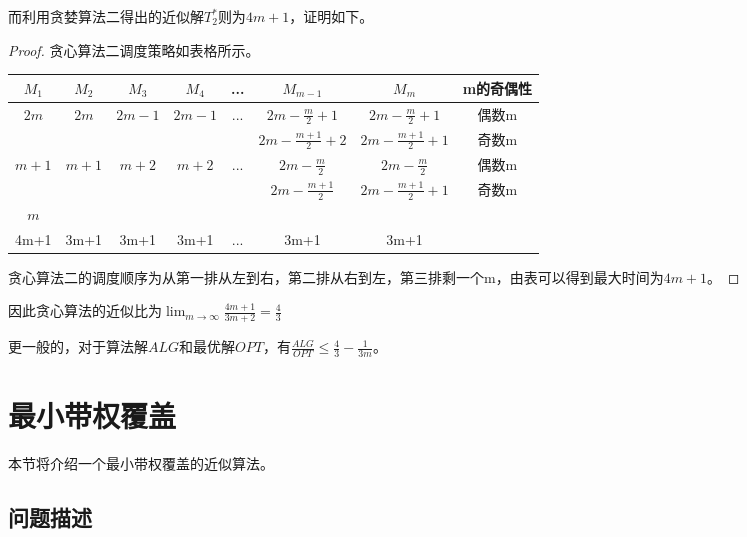 而利用贪婪算法二得出的近似解$T_2^*$则为$4m+1$，证明如下。
\begin{proof}
	贪心算法二调度策略如表格所示。
	\begin{table}[]
	\begin{tabular}{cccccccc}
	\hline
	$M_1$					&	$M_2$					&	$M_3$					&	$M_4$					&	...											&	$M_{m-1}$			&	$M_m$				&	m的奇偶性	\\ \hline
	\multirow{2}{*}{$2m$}	&	\multirow{2}{*}{$2m$}	&	\multirow{2}{*}{$2m-1$}	&	\multirow{2}{*}{$2m-1$}	&	\multicolumn{1}{c|}{\multirow{2}{*}{...}}	&	$2m-\frac{m}{2}+1$	&	$2m-\frac{m}{2}+1$	&	偶数m		\\ \cline{6-8} 
							&							&							&							&	\multicolumn{1}{c|}{}						&	$2m-\frac{m+1}{2}+2$&	$2m-\frac{m+1}{2}+1$&	奇数m		\\ \hline
	\multirow{2}{*}{$m+1$}	&	\multirow{2}{*}{$m+1$}	&	\multirow{2}{*}{$m+2$}	&	\multirow{2}{*}{$m+2$}	&	\multicolumn{1}{c|}{\multirow{2}{*}{...}}	&	$2m-\frac{m}{2}$	&	$2m-\frac{m}{2}$	&	偶数m		\\ \cline{6-8} 
							&							&							&							&	\multicolumn{1}{c|}{}						&	$2m-\frac{m+1}{2}$	&	$2m-\frac{m+1}{2}+1$&	奇数m		\\ \hline
	$m$						&							&							&							&												&						&						&				\\ \hline
	4m+1					&	3m+1					&	3m+1					&	3m+1					&	...											&	3m+1				&	3m+1				&
	\end{tabular}
	\end{table}
	
	贪心算法二的调度顺序为从第一排从左到右，第二排从右到左，第三排剩一个m，由表可以得到最大时间为$4m+1$。
\end{proof}

因此贪心算法的近似比为$\lim_{m\to \infty}\frac{4m+1}{3m+2}=\frac{4}{3}$

更一般的，对于算法解$ALG$和最优解$OPT$，有$\frac{ALG}{OPT} \leq \frac{4}{3}-\frac{1}{3m}$。



\section{最小带权覆盖}

本节将介绍一个最小带权覆盖的近似算法。

\subsection{问题描述}

